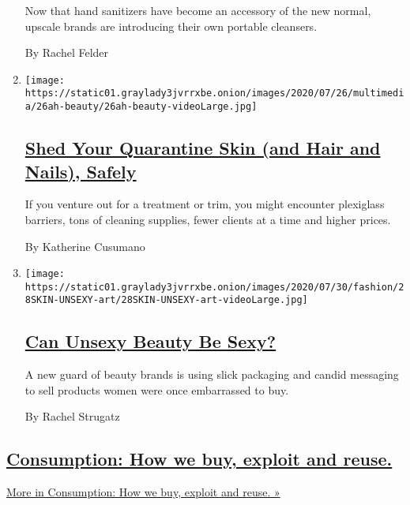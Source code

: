 \begin{enumerate}
  Now that hand sanitizers have become an accessory of the new normal,
  upscale brands are introducing their own portable cleansers.

  By Rachel Felder
\item
  \texttt{[image: https://static01.graylady3jvrrxbe.onion/images/2020/07/26/multimedia/26ah-beauty/26ah-beauty-videoLarge.jpg]}

  \hypertarget{shed-your-quarantine-skin-and-hair-and-nails-safely}{%
  \subsection{\texorpdfstring{\href{/2020/07/25/at-home/coronavirus-salons.html}{Shed
  Your Quarantine Skin (and Hair and Nails),
  Safely}}{Shed Your Quarantine Skin (and Hair and Nails), Safely}}\label{shed-your-quarantine-skin-and-hair-and-nails-safely}}

  If you venture out for a treatment or trim, you might encounter
  plexiglass barriers, tons of cleaning supplies, fewer clients at a
  time and higher prices.

  By Katherine Cusumano
\item
  \texttt{[image: https://static01.graylady3jvrrxbe.onion/images/2020/07/30/fashion/28SKIN-UNSEXY-art/28SKIN-UNSEXY-art-videoLarge.jpg]}

  \hypertarget{can-unsexy-beauty-be-sexy}{%
  \subsection{\texorpdfstring{\href{/2020/07/28/style/can-unsexy-beauty-be-sexy.html}{Can
  Unsexy Beauty Be
  Sexy?}}{Can Unsexy Beauty Be Sexy?}}\label{can-unsexy-beauty-be-sexy}}

  A new guard of beauty brands is using slick packaging and candid
  messaging to sell products women were once embarrassed to buy.

  By Rachel Strugatz
\end{enumerate}

\hypertarget{consumption-how-we-buy-exploit-and-reuse}{%
\subsection{\texorpdfstring{\href{/issue/fashion/2019/12/16/consumption}{Consumption:
How we buy, exploit and
reuse.}}{Consumption: How we buy, exploit and reuse.}}\label{consumption-how-we-buy-exploit-and-reuse}}

\href{/issue/fashion/2019/12/16/consumption}{More in Consumption: How we
buy, exploit and reuse. »}

